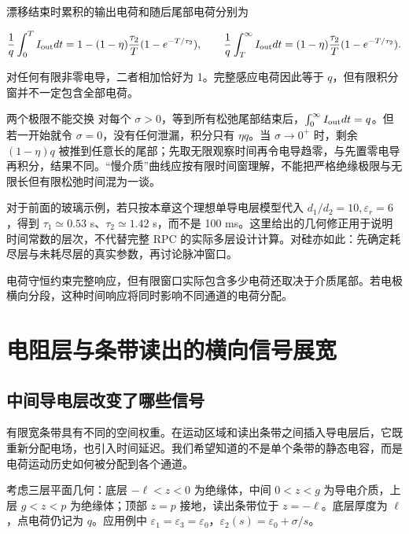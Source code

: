 \documentclass[
  11pt,
  a4paper,
  oneside,
  openany]{report}
\numberwithin{equation}{chapter}
\begin{document}
漂移结束时累积的输出电荷和随后尾部电荷分别为

\begin{equation}
\frac1q\int_0^TI_{\rm out}dt=1-(1-\eta)\frac{\tau_2}T(1-e^{-T/\tau_2}),
\qquad
\frac1q\int_T^\infty I_{\rm out}dt=(1-\eta)\frac{\tau_2}T(1-e^{-T/\tau_2}).
\end{equation}

对任何有限非零电导，二者相加恰好为 1。完整感应电荷因此等于
\(q\)，但有限积分窗并不一定包含全部电荷。

\begin{notebox}{两个极限不能交换}
对每个 $\sigma>0$，等到所有松弛尾部结束后，$\int_0^\infty I_{\rm out}dt=q$。但若一开始就令 $\sigma=0$，没有任何泄漏，积分只有 $\eta q$。当 $\sigma\to0^+$ 时，剩余 $(1-\eta)q$ 被推到任意长的尾部；先取无限观察时间再令电导趋零，与先置零电导再积分，结果不同。“慢介质”曲线应按有限时间窗理解，不能把严格绝缘极限与无限长但有限松弛时间混为一谈。
\end{notebox}

对于前面的玻璃示例，若只按本章这个理想单导电层模型代入
\(d_1/d_2=10,\varepsilon_r=6\)，得到 \(\tau_1\simeq0.53\)
s、\(\tau_2\simeq1.42\) s，而不是 100
ms。这里给出的几何修正用于说明时间常数的层次，不代替完整 RPC
的实际多层设计计算。对硅亦如此：先确定耗尽层与未耗尽层的真实参数，再讨论脉冲窗口。

电荷守恒约束完整响应，但有限窗口实际包含多少电荷还取决于介质尾部。若电极横向分段，这种时间响应将同时影响不同通道的电荷分配。

\chapter{电阻层与条带读出的横向信号展宽}\label{chap-strips}

\section{中间导电层改变了哪些信号}\label{sec-three-layer}

有限宽条带具有不同的空间权重。在运动区域和读出条带之间插入导电层后，它既重新分配电场，也引入时间延迟。我们希望知道的不是单个条带的静态电容，而是电荷运动历史如何被分配到各个通道。

考虑三层平面几何：底层 \(-\ell<z<0\) 为绝缘体，中间 \(0<z<g\)
为导电介质，上层 \(g<z<p\) 为绝缘体；顶部 \(z=p\) 接地，读出条带位于
\(z=-\ell\)。底层厚度为 \(\ell\)，点电荷仍记为 \(q\)。应用例中
\(\varepsilon_1=\varepsilon_3=\varepsilon_0\)，\(\varepsilon_2(s)=\varepsilon_0+\sigma/s\)。
\end{document}
